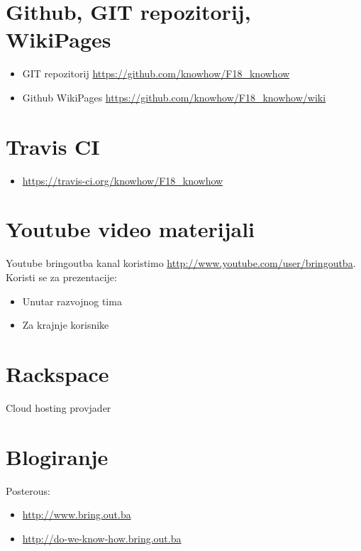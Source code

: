\documentclass[times, utf8, seminar]{fit}
\begin{document}
\section{Github, GIT repozitorij, WikiPages }

\begin{itemize}
  \item GIT repozitorij \url{https://github.com/knowhow/F18_knowhow}
  \item Github WikiPages \url{https://github.com/knowhow/F18_knowhow/wiki} 
\end{itemize}

\section{Travis CI}

\begin{itemize}
  \item \url{https://travis-ci.org/knowhow/F18_knowhow}
\end{itemize}

\section{Youtube video materijali}

Youtube bringoutba kanal koristimo \url{http://www.youtube.com/user/bringoutba}. Koristi se za prezentacije:
\begin{itemize}
 \item Unutar razvojnog tima
 \item Za krajnje korisnike
\end{itemize}

\section{Rackspace}

Cloud hosting provjader

\section{Blogiranje}

Posterous:

\begin{itemize}
  \item \url{http://www.bring.out.ba}
  \item \url{http://do-we-know-how.bring.out.ba}
\end{itemize}
\end{document}
